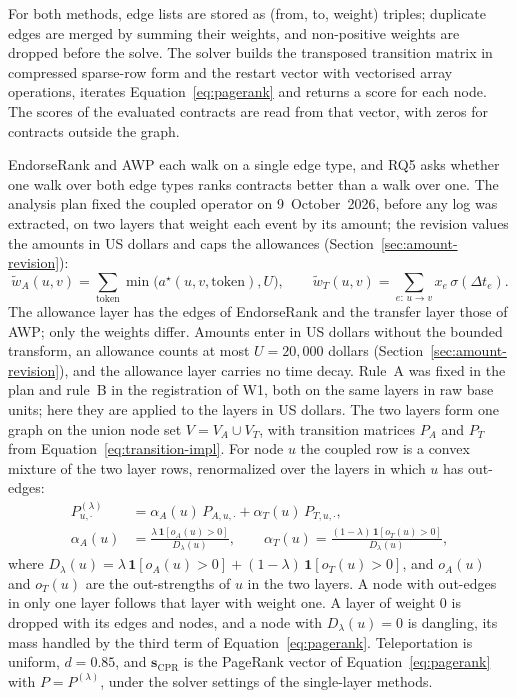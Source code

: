For both methods, edge lists are stored as (from, to, weight) triples; duplicate edges are merged by summing their weights, and non-positive weights are dropped before the solve. The solver builds the transposed transition matrix in compressed sparse-row form and the restart vector with vectorised array operations, iterates Equation~\eqref{eq:pagerank} and returns a score for each node. The scores of the evaluated contracts are read from that vector, with zeros for contracts outside the graph.


EndorseRank and AWP each walk on a single edge type, and RQ5 asks whether one walk over both edge types ranks contracts better than a walk over one. The analysis plan fixed the coupled operator on 9~October~2026, before any log was extracted, on two layers that weight each event by its amount; the revision values the amounts in US dollars and caps the allowances (Section~\ref{sec:amount-revision}):
\begin{equation}
\label{eq:raw-layers}
\tilde w_A(u,v)
=
\sum_{\mathrm{token}}
\min\bigl(a^{\star}(u,v,\mathrm{token}),U\bigr),
\qquad
\tilde w_T(u,v)
=
\sum_{e:\,u\to v}
x_e\,\sigma(\Delta t_e).
\end{equation}
The allowance layer has the edges of EndorseRank and the transfer layer those of AWP; only the weights differ. Amounts enter in US dollars without the bounded transform, an allowance counts at most $U=20{,}000$ dollars (Section~\ref{sec:amount-revision}), and the allowance layer carries no time decay. Rule~A was fixed in the plan and rule~B in the registration of W1, both on the same layers in raw base units; here they are applied to the layers in US dollars. The two layers form one graph on the union node set $V=V_A\cup V_T$, with transition matrices $P_A$ and $P_T$ from Equation~\eqref{eq:transition-impl}. For node $u$ the coupled row is a convex mixture of the two layer rows, renormalized over the layers in which $u$ has out-edges:
\begin{align}
P^{(\lambda)}_{u,\cdot}
&=
\alpha_A(u)\,P_{A,u,\cdot}+\alpha_T(u)\,P_{T,u,\cdot},
\label{eq:coupled-transition}\\
\alpha_A(u)
&=
\frac{\lambda\,\mathbf{1}[o_A(u)>0]}{D_{\lambda}(u)},
\qquad
\alpha_T(u)=\frac{(1-\lambda)\,\mathbf{1}[o_T(u)>0]}{D_{\lambda}(u)},
\nonumber
\end{align}
where $D_{\lambda}(u)=\lambda\,\mathbf{1}[o_A(u)>0]+(1-\lambda)\,\mathbf{1}[o_T(u)>0]$, and $o_A(u)$ and $o_T(u)$ are the out-strengths of $u$ in the two layers. A node with out-edges in only one layer follows that layer with weight one. A layer of weight $0$ is dropped with its edges and nodes, and a node with $D_{\lambda}(u)=0$ is dangling, its mass handled by the third term of Equation~\eqref{eq:pagerank}. Teleportation is uniform, $d=0.85$, and $\mathbf{s}_{\mathrm{CPR}}$ is the PageRank vector of Equation~\eqref{eq:pagerank} with $P=P^{(\lambda)}$, under the solver settings of the single-layer methods.


